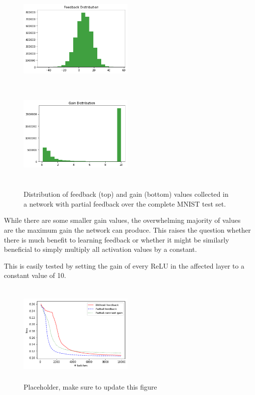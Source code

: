 \documentclass{article}
\begin{document}
 \begin{figure}
      \centering
      \includegraphics[width=0.5\textwidth,height=5cm,keepaspectratio]{img/constgainpartial.png}
      \includegraphics[width=0.5\textwidth,height=5cm,keepaspectratio]{img/constgainpartialgain.png}

      \caption{Distribution of feedback (top) and gain (bottom) values collected in a network with partial feedback over the complete MNIST test set. }
      \label{fig:partialhists}
  \end{figure}
  
  While there are some smaller gain values, the overwhelming majority of values are the maximum gain the network can produce. This raises the question whether there is much benefit to learning feedback or whether it might be similarly beneficial to simply multiply all activation values by a constant. 
  
  This is easily tested by setting the gain of every ReLU in the affected layer to a constant value of 10. 
  \begin{figure}
      \centering
      \includegraphics[width=0.5\textwidth,height=5cm,keepaspectratio]{img/constgainpartial_loss.png}
      \caption{Placeholder, make sure to update this figure}
      \label{fig:contgainpartialloss}
  \end{figure}
  
\end{document}
